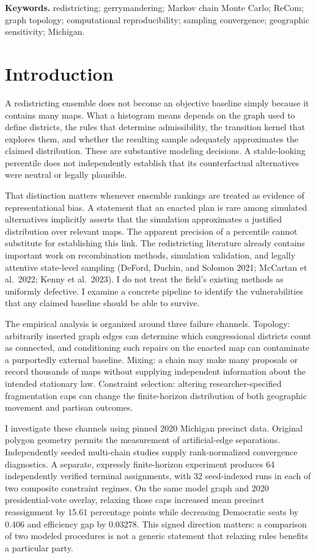 \documentclass[
  10pt,
]{article}
\begin{document}
\noindent\textbf{Keywords.} redistricting; gerrymandering; Markov chain
Monte Carlo; ReCom; graph topology; computational reproducibility;
sampling convergence; geographic sensitivity; Michigan.

\hypertarget{introduction}{%
\section{Introduction}\label{introduction}}

A redistricting ensemble does not become an objective baseline simply
because it contains many maps. What a histogram means depends on the
graph used to define districts, the rules that determine admissibility,
the transition kernel that explores them, and whether the resulting
sample adequately approximates the claimed distribution. These are
substantive modeling decisions. A stable-looking percentile does not
independently establish that its counterfactual alternatives were
neutral or legally plausible.

That distinction matters whenever ensemble rankings are treated as
evidence of representational bias. A statement that an enacted plan is
rare among simulated alternatives implicitly asserts that the simulation
approximates a justified distribution over relevant maps. The apparent
precision of a percentile cannot substitute for establishing this link.
The redistricting literature already contains important work on
recombination methods, simulation validation, and legally attentive
state-level sampling (DeFord, Duchin, and Solomon 2021; McCartan et
al.~2022; Kenny et al.~2023). I do not treat the field's existing
methods as uniformly defective. I examine a concrete pipeline to
identify the vulnerabilities that any claimed baseline should be able to
survive.

The empirical analysis is organized around three failure channels.
Topology: arbitrarily inserted graph edges can determine which
congressional districts count as connected, and conditioning such
repairs on the enacted map can contaminate a purportedly external
baseline. Mixing: a chain may make many proposals or record thousands of
maps without supplying independent information about the intended
stationary law. Constraint selection: altering researcher-specified
fragmentation caps can change the finite-horizon distribution of both
geographic movement and partisan outcomes.

I investigate these channels using pinned 2020 Michigan precinct data.
Original polygon geometry permits the measurement of artificial-edge
separations. Independently seeded multi-chain studies supply
rank-normalized convergence diagnostics. A separate, expressly
finite-horizon experiment produces 64 independently verified terminal
assignments, with 32 seed-indexed runs in each of two composite
constraint regimes. On the same model graph and 2020 presidential-vote
overlay, relaxing those caps increased mean precinct reassignment by
15.61 percentage points while decreasing Democratic seats by 0.406 and
efficiency gap by 0.03278. This signed direction matters: a comparison
of two modeled procedures is not a generic statement that relaxing rules
benefits a particular party.
\end{document}

